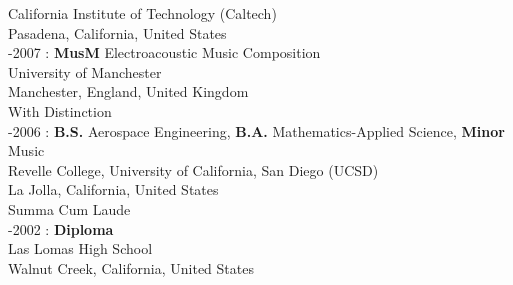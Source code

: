 California Institute of Technology (Caltech)\\
Pasadena, California, United States \\

-2007 : \textbf{MusM} Electroacoustic Music Composition\\
University of Manchester\\
Manchester, England, United Kingdom\\
With Distinction \\

-2006 : \textbf{B.S.} Aerospace Engineering, \textbf{B.A.} Mathematics-Applied Science, \textbf{Minor} Music\\
Revelle College, University of California, San Diego (UCSD)\\
La Jolla, California, United States\\
Summa Cum Laude\\

-2002 : \textbf{Diploma}\\
Las Lomas High School\\
Walnut Creek, California, United States
